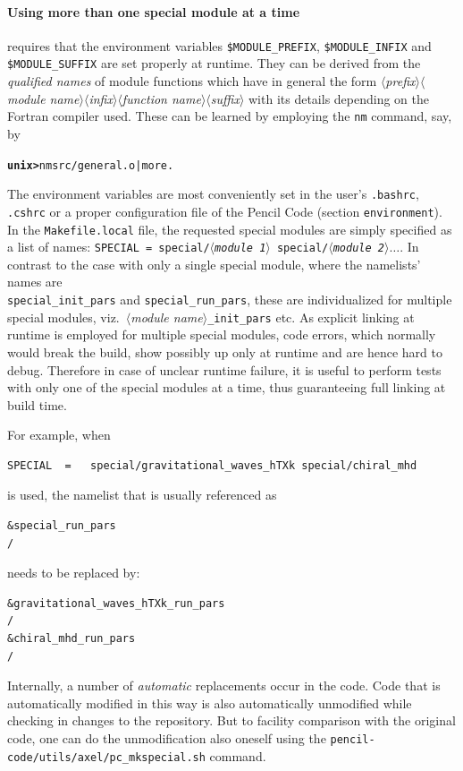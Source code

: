 \documentclass[\mydriver,12pt,twoside,notitlepage,a4paper]{article}
\newcommand{\prompt}[1]{{\ttfamily\bfseries{}#1}}
\begin{document}
\paragraph
{Using more than one special module at a time} requires that the environment
variables {\tt \$MODULE_PREFIX}, {\tt \$MODULE_INFIX} and {\tt \$MODULE_SUFFIX}
are set properly at runtime. They can be derived from the {\it qualified names}
of module functions which have in general the form 
 $\langle${\it prefix}$\rangle\langle${\it module name}$\rangle\langle${\it infix}$\rangle\langle${\it function name}$\rangle\langle${\it suffix}$\rangle$
with its details depending on the Fortran compiler used. These can be learned by employing the {\tt nm} command, say, by 
\begin{alltt}
 \prompt{unix> }  nm src/general.o | more .
\end{alltt}
The environment variables are most conveniently set in the user's {\tt .bashrc}, {\tt .cshrc} or a proper configuration file of the {\sc Pencil Code} (section {\tt environment}).
In the {\tt Makefile.local} file, the requested special modules are simply specified as a list of names:
{\tt SPECIAL = special/$\langle${\it module 1}$\rangle$ special/$\langle${\it module 2}$\rangle\ldots$}.
In contrast to the case with only a single special module, where the namelists' names are \\
{\tt special_init_pars} and {\tt special_run_pars},
these are individualized for multiple special modules, viz.\ $\langle${\it module name}$\rangle${\tt _init_pars} etc.
As explicit linking at runtime is employed for multiple special modules, code errors, which normally would break the build, show possibly up only at runtime
and are hence hard to debug. Therefore in case of unclear runtime failure, it is useful to perform tests with only one of the special modules at a time, thus
guaranteeing full linking at build time.

For example, when
\begin{verbatim}
SPECIAL  =   special/gravitational_waves_hTXk special/chiral_mhd
\end{verbatim}
is used, the namelist that is usually referenced as
\begin{verbatim}
&special_run_pars
/
\end{verbatim}
needs to be replaced by:
\begin{verbatim}
&gravitational_waves_hTXk_run_pars
/
&chiral_mhd_run_pars
/
\end{verbatim}
Internally, a number of \textit{automatic} replacements occur in the code.
Code that is automatically modified in this way is also automatically
unmodified while checking in changes to the repository.
But to facility comparison with the original code, one can do the unmodification
also oneself using the {\tt pencil-code/utils/axel/pc\_mkspecial.sh} command.
\end{document}
